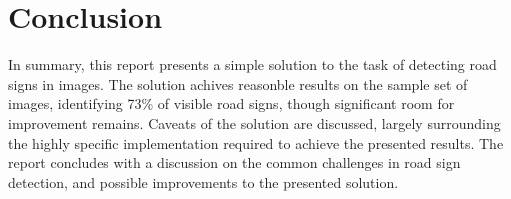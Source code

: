 \section{Conclusion}

In summary, this report presents a simple solution to the task of detecting road signs in images. The solution achives reasonble results on the sample set of images, identifying 73\% of visible road signs, though significant room for improvement remains. Caveats of the solution are discussed, largely surrounding the highly specific implementation required to achieve the presented results. The report concludes with a discussion on the common challenges in road sign detection, and possible improvements to the presented solution.
